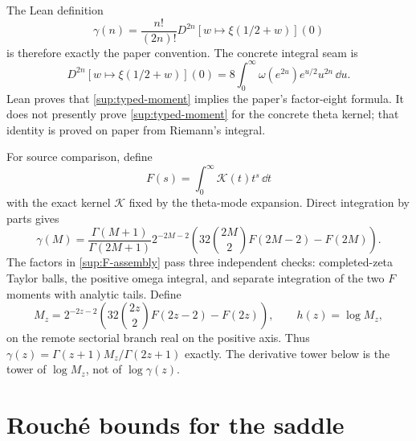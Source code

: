 \documentclass[10pt]{article}
\begin{document}
The Lean definition
\[
 \gamma(n)=\frac{n!}{(2n)!}
 D^{2n}[w\mapsto\xi(1/2+w)](0)
\]
is therefore exactly the paper convention.  The concrete integral seam is
\begin{equation}\label{sup:typed-moment}
 D^{2n}[w\mapsto\xi(1/2+w)](0)
 =8\int_0^\infty\omega(e^{2u})e^{u/2}u^{2n}\,\dd u.
\end{equation}
Lean proves that \eqref{sup:typed-moment} implies the paper's factor-eight
formula.  It does not presently prove \eqref{sup:typed-moment} for the
concrete theta kernel; that identity is proved on paper from Riemann's
integral.

For source comparison, define
\[
 F(s)=\int_0^\infty \mathcal K(t)t^s\,\dd t
\]
with the exact kernel $\mathcal K$ fixed by the theta-mode expansion.  Direct
integration by parts gives
\begin{equation}\label{sup:F-assembly}
 \gamma(M)=\frac{\Gamma(M+1)}{\Gamma(2M+1)}2^{-2M-2}
 \left(32\binom{2M}{2}F(2M-2)-F(2M)\right).
\end{equation}
The factors in \eqref{sup:F-assembly} pass three independent checks:
completed-zeta Taylor balls, the positive omega integral, and separate
integration of the two $F$ moments with analytic tails.
Define
\[
 M_z=2^{-2z-2}\left(32\binom{2z}{2}F(2z-2)-F(2z)\right),
 \qquad h(z)=\log M_z,
\]
on the remote sectorial branch real on the positive axis.  Thus
$\gamma(z)=\Gamma(z+1)M_z/\Gamma(2z+1)$ exactly.  The derivative tower below
is the tower of $\log M_z$, not of $\log\gamma(z)$.

\section{Rouch\'e bounds for the saddle}\label{sup:rouche}
\end{document}
